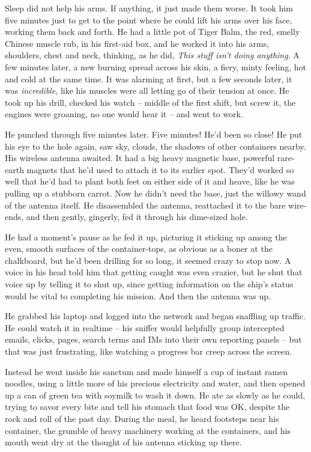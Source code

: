 Sleep did not help his arms. If anything, it just made them worse.
It took him five minutes just to get to the point where he could
lift his arms over his face, working them back and forth. He had a
little pot of Tiger Balm, the red, smelly Chinese muscle rub, in
his first-aid box, and he worked it into his arms, shoulders, chest
and neck, thinking, as he did,
\emph{This stuff isn't doing anything}. A few minutes later, a new
burning spread across his skin, a fiery, minty feeling, hot and
cold at the same time. It was alarming at first, but a few seconds
later, it was \emph{incredible}, like his muscles were all letting
go of their tension at once. He took up his drill, checked his
watch -- middle of the first shift, but screw it, the engines were
groaning, no one would hear it -- and went to work.

He punched through five minutes later. Five minutes! He'd been so
close! He put his eye to the hole again, saw sky, clouds, the
shadows of other containers nearby. His wireless antenna awaited.
It had a big heavy magnetic base, powerful rare-earth magnets that
he'd used to attach it to its earlier spot. They'd worked so well
that he'd had to plant both feet on either side of it and heave,
like he was pulling up a stubborn carrot. Now he didn't need the
base, just the willowy wand of the antenna itself. He disassembled
the antenna, reattached it to the bare wire-ends, and then gently,
gingerly, fed it through his dime-sized hole.

He had a moment's pause as he fed it up, picturing it sticking up
among the even, smooth surfaces of the container-tops, as obvious
as a boner at the chalkboard, but he'd been drilling for so long,
it seemed crazy to stop now. A voice in his head told him that
getting caught was even crazier, but he shut that voice up by
telling it to shut up, since getting information on the ship's
status would be vital to completing his mission. And then the
antenna was up.

He grabbed his laptop and logged into the network and began
snaffling up traffic. He could watch it in realtime -- his sniffer
would helpfully group intercepted emails, clicks, pages, search
terms and IMs into their own reporting panels -- but that was just
frustrating, like watching a progress bar creep across the screen.

Instead he went inside his sanctum and made himself a cup of
instant ramen noodles, using a little more of his precious
electricity and water, and then opened up a can of green tea with
soymilk to wash it down. He ate as slowly as he could, trying to
savor every bite and tell his stomach that food was OK, despite the
rock and roll of the past day. During the meal, he heard footsteps
near his container, the grumble of heavy machinery working at the
containers, and his mouth went dry at the thought of his antenna
sticking up there.

